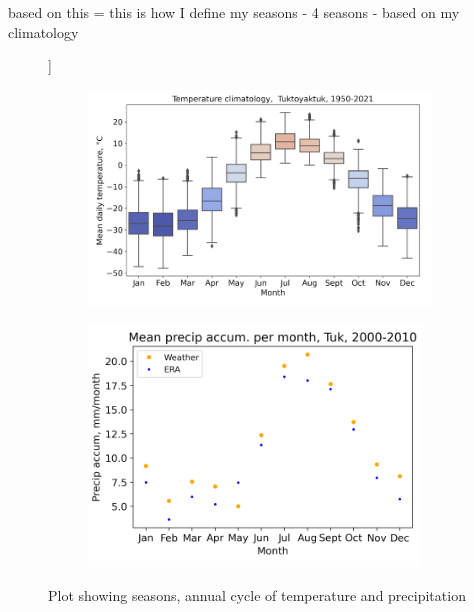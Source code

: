 \documentclass[draft]{agujournal2019}
\begin{document}
based on this = this is how I define my seasons - 4 seasons - based on my climatology

\begin{figure}[h!tbp]]
\centering
\begin{subfigure}[b]{0.55\textwidth}
   \includegraphics[width=1\linewidth]{figures/temperature_climatologly_tuktoyaktuk.png}
   \caption{}
   \label{fig:Ng1} 
\end{subfigure}

\begin{subfigure}[b]{0.55\textwidth}
   \includegraphics[width=1\linewidth]{figures/precip_accum_per_month_tuk_00_10.png}
   \caption{}
   \label{fig:Ng2}
\end{subfigure}

\caption{Plot showing seasons, annual cycle of temperature and precipitation}
\end{figure}
\end{document}
